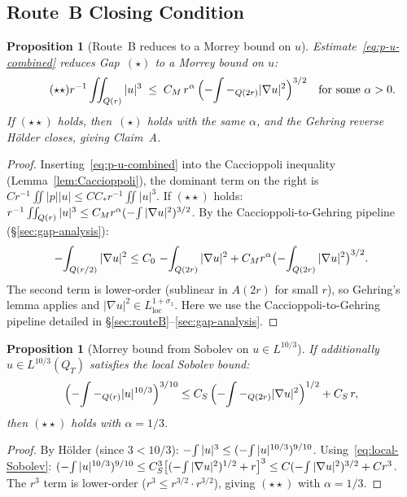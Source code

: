 \documentclass[11pt]{article}
\newtheorem{proposition}[theorem]{Proposition}
\theoremstyle{definition}
\theoremstyle{remark}
\newcommand{\Xint}{\mathop{\mathchoice{\vcenter{\hbox{$\displaystyle-$}}}%
  {\vcenter{\hbox{$\textstyle-$}}}%
  {\vcenter{\hbox{$\scriptstyle-$}}}%
  {\vcenter{\hbox{$\scriptscriptstyle-$}}}}\!\int}
\begin{document}
\subsection{Route~B Closing Condition}
\label{sec:route-B-close}

\begin{proposition}[Route~B reduces to a Morrey bound on $u$]
\label{prop:route-B-morrey}
  Estimate~\eqref{eq:p-u-combined} reduces Gap~$(\star)$ to a
  \emph{Morrey bound on $u$}:
  \begin{equation}\tag{$\star\star$}
    r^{-1}\iint_{Q(r)}|u|^3
    \;\leq\; C_M\,r^{\alpha}\,\Bigl(\Xint-_{Q(2r)}|\nabla u|^2\Bigr)^{3/2}
    \quad\text{for some }\alpha>0.
  \end{equation}
  If $(\star\star)$ holds, then~$(\star)$ holds with the same $\alpha$,
  and the Gehring reverse H\"older closes, giving Claim~A.
\end{proposition}

\begin{proof}
  Inserting~\eqref{eq:p-u-combined} into the Caccioppoli inequality
  (Lemma~\ref{lem:Caccioppoli}), the dominant term on the right is
  $Cr^{-1}\iint|p||u|\leq CC_*r^{-1}\iint|u|^3$.
  If $(\star\star)$ holds:
  $r^{-1}\iint_{Q(r)}|u|^3\leq C_M r^\alpha(\Xint|\nabla u|^2)^{3/2}$.
  By the Caccioppoli-to-Gehring pipeline (§\ref{sec:gap-analysis}):
  \[
    \Xint_{Q(r/2)}|\nabla u|^2
    \leq C_0\,\Xint_{Q(2r)}|\nabla u|^2
    + C_M r^\alpha\bigl(\Xint_{Q(2r)}|\nabla u|^2\bigr)^{3/2}.
  \]
  The second term is lower-order (sublinear in $A(2r)$ for small $r$),
  so Gehring's lemma applies and $|\nabla u|^2\in L^{1+\sigma_1}_{\mathrm{loc}}$.
  Here we use the Caccioppoli-to-Gehring pipeline detailed in
  §\ref{sec:routeB}--\ref{sec:gap-analysis}.
\end{proof}

\begin{proposition}[Morrey bound from Sobolev on $u\in L^{10/3}$]
\label{prop:morrey-L103}
  If additionally $u\in L^{10/3}(Q_T)$ satisfies the local Sobolev bound:
  \begin{equation}\label{eq:local-Sobolev}
    \Bigl(\Xint-_{Q(r)}|u|^{10/3}\Bigr)^{3/10}
    \leq C_S\,\Bigl(\Xint-_{Q(2r)}|\nabla u|^2\Bigr)^{1/2} + C_S\,r,
  \end{equation}
  then $(\star\star)$ holds with $\alpha=1/3$.
\end{proposition}

\begin{proof}
  By H\"older (since $3<10/3$):
  $\Xint|u|^3\leq(\Xint|u|^{10/3})^{9/10}$.
  Using~\eqref{eq:local-Sobolev}:
  $(\Xint|u|^{10/3})^{9/10}\leq
  C_S^3\bigl[(\Xint|\nabla u|^2)^{1/2}+r\bigr]^3
  \leq C(\Xint|\nabla u|^2)^{3/2}+Cr^3$.
  The $r^3$ term is lower-order ($r^3\leq r^{3/2}\cdot r^{3/2}$),
  giving $(\star\star)$ with $\alpha=1/3$.
\end{proof}
\end{document}
